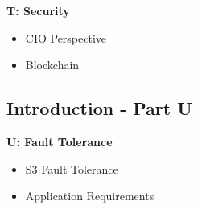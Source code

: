 \textbf{T: Security}
\begin{itemize}
\item CIO Perspective
\item Blockchain
\end{itemize} 

\subsection{Introduction - Part U}\label{s:cloud-fundamentals-u}

\textbf{U: Fault Tolerance}
\begin{itemize}
\item S3 Fault Tolerance
\item Application Requirements
\end{itemize} 
